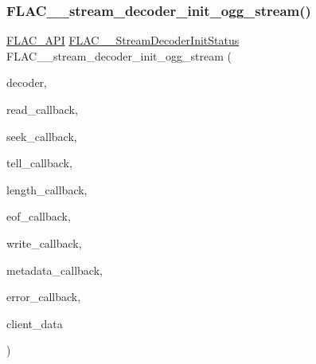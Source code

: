 \subsubsection{\texorpdfstring{F\+L\+A\+C\+\_\+\+\_\+stream\+\_\+decoder\+\_\+init\+\_\+ogg\+\_\+stream()}{FLAC\_\_stream\_decoder\_init\_ogg\_stream()}}
{\footnotesize\ttfamily \hyperlink{group__flac__export_ga56ca07df8a23310707732b1c0007d6f5}{F\+L\+A\+C\+\_\+\+A\+PI} \hyperlink{group__flac__stream__decoder_gaaed54a24ac6310d29c5cafba79759c44}{F\+L\+A\+C\+\_\+\+\_\+\+Stream\+Decoder\+Init\+Status} F\+L\+A\+C\+\_\+\+\_\+stream\+\_\+decoder\+\_\+init\+\_\+ogg\+\_\+stream (\begin{DoxyParamCaption}\item[{\hyperlink{struct_f_l_a_c_____stream_decoder}{F\+L\+A\+C\+\_\+\+\_\+\+Stream\+Decoder} $\ast$}]{decoder,  }\item[{\hyperlink{group__flac__stream__decoder_ga25d4321dc2f122d35ddc9061f44beae7}{F\+L\+A\+C\+\_\+\+\_\+\+Stream\+Decoder\+Read\+Callback}}]{read\+\_\+callback,  }\item[{\hyperlink{group__flac__stream__decoder_ga4c18b0216e0f7a83d7e4e7001230545d}{F\+L\+A\+C\+\_\+\+\_\+\+Stream\+Decoder\+Seek\+Callback}}]{seek\+\_\+callback,  }\item[{\hyperlink{group__flac__stream__decoder_gafdf1852486617a40c285c0d76d451a5a}{F\+L\+A\+C\+\_\+\+\_\+\+Stream\+Decoder\+Tell\+Callback}}]{tell\+\_\+callback,  }\item[{\hyperlink{group__flac__stream__decoder_ga5363f3b46e3f7d6a73385f6560f7e7ef}{F\+L\+A\+C\+\_\+\+\_\+\+Stream\+Decoder\+Length\+Callback}}]{length\+\_\+callback,  }\item[{\hyperlink{group__flac__stream__decoder_ga4eac094fc609363532d90cf8374b4f7e}{F\+L\+A\+C\+\_\+\+\_\+\+Stream\+Decoder\+Eof\+Callback}}]{eof\+\_\+callback,  }\item[{\hyperlink{group__flac__stream__decoder_ga61e48dc2c0d2f6c5519290ff046874a4}{F\+L\+A\+C\+\_\+\+\_\+\+Stream\+Decoder\+Write\+Callback}}]{write\+\_\+callback,  }\item[{\hyperlink{group__flac__stream__decoder_ga6aa87c01744c1c601b7f371f627b6e14}{F\+L\+A\+C\+\_\+\+\_\+\+Stream\+Decoder\+Metadata\+Callback}}]{metadata\+\_\+callback,  }\item[{\hyperlink{group__flac__stream__decoder_gac896ee6a12668e9015fab4fbc6aae996}{F\+L\+A\+C\+\_\+\+\_\+\+Stream\+Decoder\+Error\+Callback}}]{error\+\_\+callback,  }\item[{\hyperlink{png_8h_ac9c84fa68bbad002983e35ce3663c686}{void} $\ast$}]{client\+\_\+data }\end{DoxyParamCaption})}

